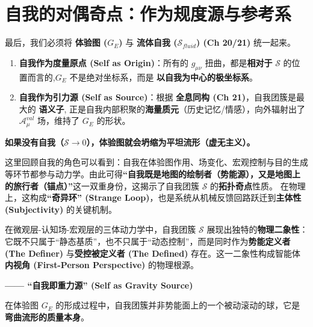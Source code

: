\section{自我的对偶奇点：作为规度源与参考系}
\label{sec:section_7533}

最后，我们必须将 \textbf{体验图 ($G_E$)} 与 \textbf{流体自我 ($\mathcal{S}_{fluid}$) (Ch 20/21)} 统一起来。
\begin{enumerate}
    \item \textbf{自我作为度量原点 (Self as Origin)}：所有的 $g_{\mu\nu}$ 扭曲，都是\textbf{相对于} $\mathcal{S}$ 的位置而言的,$G_E$ 不是绝对坐标系，而是 \textbf{以自我为中心的极坐标系}。
    \item \textbf{自我作为引力源 (Self as Source)}：根据 \textbf{全息同构 (Ch 21)}，自我团簇是最大的 \textbf{语义子}, 正是自我内部积聚的\textbf{海量质元}（历史记忆/情感），向外辐射出了 $\mathcal{A}_\mu^{val}$ 场，维持了 $G_E$ 的形状。
\end{enumerate}
\textbf{如果没有自我（$\mathcal{S} \to 0$），体验图就会坍缩为平坦流形（虚无主义）。}


这里回顾自我的角色可以看到：自我在体验图作用、场变化、宏观控制与目的生成等环节都参与动力学。由此可得\textbf{“自我既是地图的绘制者（势能源），又是地图上的旅行者（锚点）”}这一双重身份，这揭示了自我团簇 $\mathcal{S}$ 的\textbf{拓扑奇点}性质。
在物理上，这构成\textbf{“奇异环” (Strange Loop)}，也是系统从机械反馈回路跃迁到\textbf{主体性 (Subjectivity)} 的关键机制。


在微观层-认知场-宏观层的三体动力学中，自我团簇 $\mathcal{S}$ 展现出独特的\textbf{物理二象性}：它既不只属于“静态基质”，也不只属于“动态控制”，而是同时作为\textbf{势能定义者 (The Definer)} 与\textbf{受控被定义者 (The Defined)} 存在。这一二象性构成智能体\textbf{内视角 (First-Person Perspective)} 的物理根源。



\textbf{—— “自我即重力源” (Self as Gravity Source)}

在体验图 $G_E$ 的形成过程中，自我团簇并非势能面上的一个被动滚动的球，它是\textbf{弯曲流形的质量本身}。

